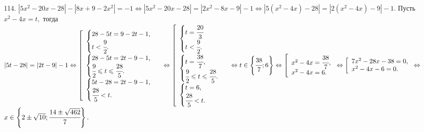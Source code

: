 114. $|5x^2-20x-28|-|8x+9-2x^2|=-1\Leftrightarrow |5x^2-20x-28|=|2x^2-8x-9|-1\Leftrightarrow |5(x^2-4x)-28|=|2(x^2-4x)-9|-1.$ Пусть $x^2-4x=t,$ тогда $|5t-28|=|2t-9|-1\Leftrightarrow \left[\begin{array}{l}\begin{cases} 28-5t=9-2t-1,\\ t<\cfrac{9}{2}.\end{cases}\\ \begin{cases} 28-5t=2t-9-1,\\ \cfrac{9}{2}\leqslant t\leqslant\cfrac{28}{5}.\end{cases}\\ \begin{cases} 5t-28=2t-9-1,\\ \cfrac{28}{5}<t.\end{cases}\end{array}\right.\Leftrightarrow \left[\begin{array}{l}\begin{cases} t=\cfrac{20}{3}\\ t<\cfrac{9}{2}.\end{cases}\\ \begin{cases} t=\cfrac{38}{7},\\ \cfrac{9}{2}\leqslant t\leqslant\cfrac{28}{5}.\end{cases}\\ \begin{cases} t=6,\\ \cfrac{28}{5}<t.\end{cases}\end{array}\right.\Leftrightarrow
t\in\left\{\cfrac{38}{7};6\right\}\Leftrightarrow
\left[\begin{array}{l}x^2-4x=\cfrac{38}{7},\\ x^2-4x=6.\end{array}\right.\Leftrightarrow
\left[\begin{array}{l}7x^2-28x-38=0,\\ x^2-4x-6=0.\end{array}\right.\Leftrightarrow$\\$
x\in\left\{2\pm\sqrt{10};\cfrac{14\pm\sqrt{462}}{7}\right\}.$\\
